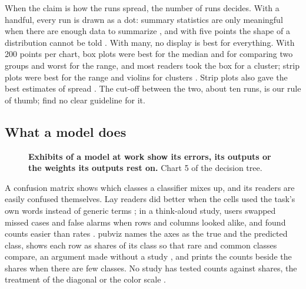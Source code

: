 \documentclass[11pt]{article}
\begin{document}
When the claim is how the runs spread, the number of runs decides. With a
handful, every run is drawn as a dot: summary statistics are only meaningful
when there are enough data to summarize \citep[pp.~5--6]{weissgerber2015beyond},
and with five points the shape of a distribution cannot be told
\citep[Fig.~7]{weissgerber2019reveal}. With many, no display is best for
everything. With 200 points per chart, box plots were best for the median and
for comparing two groups and worst for the range, and most readers took the
box for a cluster; strip plots were best for the range and violins for
clusters \citep[Sec.~4]{lotteraner2026investigating}. Strip plots also gave
the best estimates of spread \citep[Table~1]{newburger2023fitting}. The
cut-off between the two, about ten runs, is our rule of thumb;
\citet{weissgerber2019reveal} find no clear guideline for it.

\subsection{What a model does}

\begin{figure}[tb]
  \centering
  \pvtreeModel
  \caption{\textbf{Exhibits of a model at work show its errors, its outputs
    or the weights its outputs rest on.} Chart 5 of the decision tree.}
  \label{fig:tree-model}
\end{figure}

A confusion matrix shows which classes a classifier mixes up, and its
readers are easily confused themselves. Lay readers did better when the
cells used the task's own words instead of generic terms
\citep[Table~2]{shen2020designing}; in a think-aloud study, users swapped
missed cases and false alarms when rows and columns looked alike, and found
counts easier than rates \citep[Secs.~7.4--7.5]{beauxisaussalet2019supporting}.
pubviz names the axes as the true and the predicted class, shows each row as
shares of its class so that rare and common classes compare, an argument
made without a study \citep[Sec.~4.1]{gortler2022neo}, and prints the counts
beside the shares when there are few classes. No study has tested counts
against shares, the treatment of the diagonal or the color scale
\citep[Sec.~7.1]{ren2017squares}.
\end{document}
